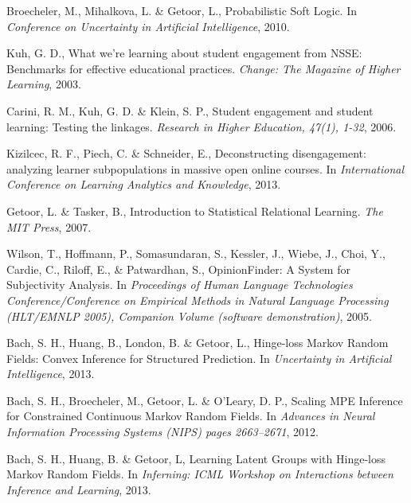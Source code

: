 \begin{thebibliography}{1}
Broecheler, M., Mihalkova, L. \& Getoor, L.,
  Probabilistic Soft Logic.
In {\it Conference on Uncertainty in Artificial Intelligence}, 2010.

 Kuh, G. D.,
What we're learning about student engagement from NSSE: Benchmarks for effective educational practices.
{\it Change: The Magazine of Higher Learning}, 2003.

Carini, R. M., Kuh, G. D. \& Klein, S. P.,
Student engagement and student learning: Testing the linkages.
{\it Research in Higher Education, 47(1), 1-32}, 2006.

Kizilcec, R. F., Piech, C. \& Schneider, E.,
Deconstructing disengagement: analyzing learner subpopulations in massive open online courses.
In {\it International Conference on Learning Analytics and Knowledge}, 2013.

Getoor, L. \& Tasker, B.,
  Introduction to Statistical Relational Learning.
{\it The MIT Press}, 2007.

Wilson, T., Hoffmann, P., Somasundaran, S., Kessler, J., Wiebe, J., Choi, Y., Cardie, C., Riloff, E., \& Patwardhan, S.,
OpinionFinder: A System for Subjectivity Analysis.
In {\it Proceedings of
Human Language Technologies Conference/Conference on Empirical Methods
in Natural Language Processing (HLT/EMNLP 2005), Companion
	Volume (software demonstration)}, 2005.
	
Bach, S. H., Huang, B., London, B. \& Getoor, L.,
Hinge-loss Markov Random Fields: Convex Inference for Structured Prediction.
In {\it Uncertainty in Artificial Intelligence}, 2013.

Bach, S. H., Broecheler, M., Getoor, L. \& O'Leary, D. P.,
Scaling MPE Inference for Constrained Continuous Markov Random Fields.
In {\it Advances in Neural Information Processing Systems (NIPS) pages 2663--2671}, 2012.

Bach, S. H., Huang, B. \& Getoor, L,
Learning Latent Groups with Hinge-loss Markov Random Fields.
In {\it Inferning: ICML Workshop on Interactions between Inference and Learning}, 2013.

\end{thebibliography} 